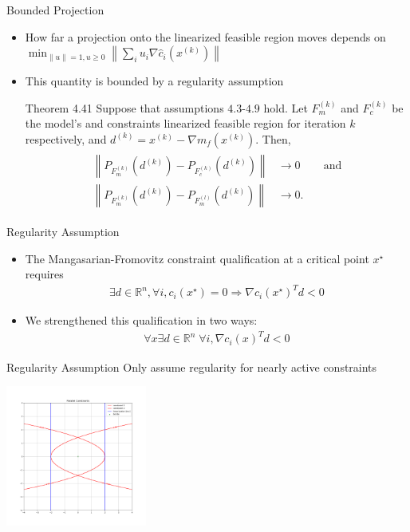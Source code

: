 \documentclass{beamer}
\newcommand{\Rn}{\mathbb R ^ {n}}
\newcommand{\xk}{{{x}^{(k)}}}
\newcommand{\neggrad}{d^{(k)}}
\begin{document}
\begin{frame}{Bounded Projection}
	\begin{itemize}
		\item How far a projection onto the linearized feasible region moves depends on
		$
			\min_{\|u\| = 1, u \ge 0} \left\|\sum_{i} u_i \nabla \hat c_i\left(\xk\right)\right\|
		$
		\item This quantity is bounded by a regularity assumption
		\begin{block}{Theorem 4.41}
			Suppose that assumptions $4.3$-$4.9$ hold.
			Let $F_m^{(k)}$ and $F_c^{(k)}$ be the model's and constraints linearized feasible region for iteration $k$ respectively,
			and $\neggrad = \xk - \nabla m_f\left(\xk\right)$. Then,
			\begin{align*}
				\begin{array}{ccc}
					\left\|P_{F_m^{(k)}}\left(\neggrad\right)
					-  P_{F_c^{(k)}}\left(\neggrad\right)\right\| & \to 0 & \quad \textrm{and} \\
					\left\|P_{F_m^{(k)}}\left(\neggrad\right)
					-  P_{F_m^{(l)}}\left(\neggrad\right)\right\| & \to 0. & 
				\end{array}
			\end{align*}
		\end{block}
	\end{itemize}
\end{frame}



\begin{frame}{Regularity Assumption}
\begin{itemize}
\item The Mangasarian-Fromovitz constraint qualification at a critical point $x^{\star}$ requires
\begin{align*}
\exists d \in \Rn, \forall i, c_i\left(x^{\star}\right)=0 \Longrightarrow \nabla c_i\left(x^{\star}\right)^T d < 0 
\end{align*}
\item We strengthened this qualification in two ways:
\begin{align*}
\forall x \exists d \in \Rn\; \forall i, \nabla c_i\left(x\right)^T d < 0
\end{align*}
\end{itemize}
\end{frame}


\begin{frame}{Regularity Assumption}
	Only assume regularity for nearly active constraints
	\begin{center}
		\includegraphics[width=175px]{images/local_regularity.png}
	\end{center}
\end{frame}
\end{document}
